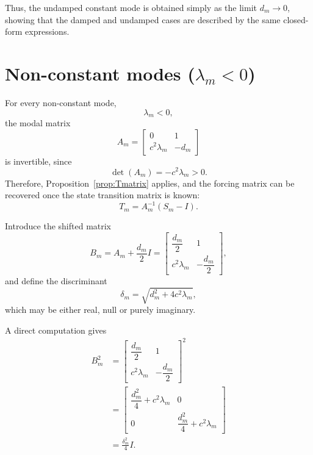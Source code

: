 \documentclass{Configuration_Files/PoliMi3i_thesis}
\begin{document}
Thus, the undamped constant mode is obtained simply as the limit \(d_m\rightarrow0\), showing that the damped and undamped cases are described by the same closed-form expressions.

\section{Non-constant modes (\texorpdfstring{$\lambda_m<0$}{lambda m < 0})}

For every non-constant mode,
\begin{equation*}
\lambda_m<0,
\end{equation*}
the modal matrix
\begin{equation*}
A_m=
\begin{bmatrix}
0 & 1\\
c^2\lambda_m & -d_m
\end{bmatrix}
\end{equation*}
is invertible, since
\begin{equation*}
\det(A_m)
=
-c^2\lambda_m
>
0.
\end{equation*}
Therefore, Proposition~\ref{prop:Tmatrix} applies, and the forcing matrix can be recovered once the state transition matrix is known:
\begin{equation*}
T_m
=
A_m^{-1}(S_m-I).
\end{equation*}

Introduce the shifted matrix
\begin{equation*}
B_m
=
A_m+\frac{d_m}{2}I
=
\begin{bmatrix}
\dfrac{d_m}{2} & 1\\
c^2\lambda_m & -\dfrac{d_m}{2}
\end{bmatrix},
\end{equation*}
and define the discriminant
\begin{equation*}
\delta_m
=
\sqrt{d_m^2+4c^2\lambda_m},
\end{equation*}
which may be either real, null or purely imaginary.

A direct computation gives
\begin{align}
B_m^2
&=
\begin{bmatrix}
\dfrac{d_m}{2} & 1\\
c^2\lambda_m & -\dfrac{d_m}{2}
\end{bmatrix}^2
\nonumber\\
&=
\begin{bmatrix}
\dfrac{d_m^2}{4}+c^2\lambda_m & 0\\
0 & \dfrac{d_m^2}{4}+c^2\lambda_m
\end{bmatrix}
\nonumber\\
&=
\frac{\delta_m^2}{4}I.
\label{eq:Bsquare}
\end{align}
\end{document}
